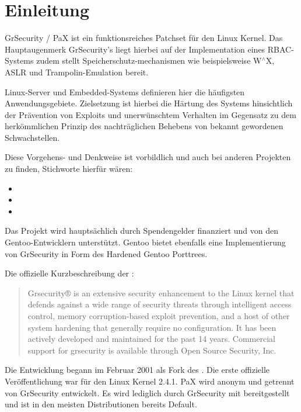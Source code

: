 \section{Einleitung}
\label{sec:Einleitung}
GrSecurity / PaX ist ein funktionsreiches Patchset für den Linux Kernel. Das Hauptaugenmerk GrSecurity's liegt hierbei auf der Implementation eines RBAC-Systems zudem stellt  Speicherschutz-mechanismen wie beispielsweise W$^\land$X, ASLR und Trampolin-Emulation bereit.

Linux-Server und Embedded-Systems definieren hier die häufigsten Anwendungsgebiete.
Zielsetzung ist hierbei die Härtung des Systems hinsichtlich der Prävention von Exploits und unerwünschtem Verhalten im Gegensatz zu dem herkömmlichen Prinzip des nachträglichen Behebens von bekannt gewordenen Schwachstellen.

Diese Vorgehens- und Denkweise ist vorbildlich und auch bei anderen Projekten zu finden, Stichworte hierfür wären:
\begin{itemize}
\item {}
\item {}
\item {}
\end{itemize}

Das Projekt wird hauptsächlich durch Spendengelder finanziert und von den Gentoo-Entwicklern unterstützt. Gentoo bietet ebenfalls eine Implementierung von GrSecurity in Form des Hardened Gentoo Porttrees.

\newpage
Die offizielle Kurzbeschreibung der :
\begin{quote}
Grsecurity® is an extensive security enhancement to the Linux kernel that defends against a wide range of security threats through intelligent access control, memory corruption-based exploit prevention, and a host of other system hardening that generally require no configuration. It has been actively developed and maintained for the past 14 years. Commercial support for grsecurity is available through Open Source Security, Inc.
\end{quote}

Die Entwicklung begann im Februar 2001 als Fork des . Die erste offizielle Veröffentlichung war für den Linux Kernel 2.4.1.
PaX wird anonym und getrennt von GrSecurity entwickelt. Es wird lediglich durch GrSecurity mit bereitgestellt und ist in den meisten Distributionen bereits Default.


